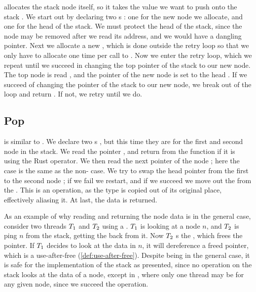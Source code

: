  allocates the stack node itself, so it takes the value we want to push onto the stack
. We start out by declaring two s : one for the new node we
allocate, and one for the head of the stack. We must protect the head of the stack, since the node
may be removed after we read its address, and we would have a dangling pointer.  Next we allocate a
new  , which is done outside the retry loop so that we only have to
allocate one time per call to . Now we enter the retry loop, which we repeat until we
succeed in changing the top pointer of the stack to our new node.
The top node is read , and the  pointer of the new node is set to the head
. If we succeed of changing the   pointer of the stack to our new node, we
break out of the loop and return . If not, we retry until we do.


\subsection{Pop}

 is similar to . We declare two s , but this time
they are for the first and second node in the stack. We read the  pointer ,
and return from the function if it is  using the  Rust operator. We then read
the next pointer of the node ; here the  case is the same as the
non- case. We try to swap the head pointer from the first to the second node
; if we fail we restart, and if we succeed we move out the  from the
. This is an  operation, as the type is copied out of its original place,
effectively aliasing it. At last, the data is returned.

As an example of why reading and returning the node data is  in the general case,
consider two threads $T\sb{1}$ and $T\sb{2}$ using a . $T\sb{1}$ is looking at
a node $n$, and $T\sb{2}$ is ping $n$ from the stack, getting the  back from
it. Now $T\sb{2}$ s the , which frees the pointer. If $T\sb{1}$ decides to
look at the data in $n$, it will dereference a freed pointer, which is a use-after-free
(\cref{def:use-after-free}). Despite being  in the general case, it is safe for the
implementation of the stack as presented, since no operation on the stack looks at the data of a
node, except in , where only one thread may be for any given node, since we succeed
the  operation.




